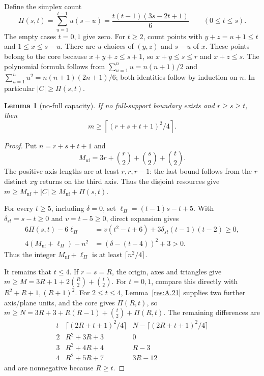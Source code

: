 \documentclass[11pt]{article}
\newtheorem{lemma}[theorem]{Lemma}
\theoremstyle{definition}
\theoremstyle{remark}
\theoremstyle{plain}
\begin{document}
Define the simplex count
\[
\Pi(s,t)=\sum_{u=1}^{t-1}u(s-u)
=\frac{t(t-1)(3s-2t+1)}6\qquad(0\le t\le s).
\]
The empty cases \(t=0,1\) give zero. For \(t\ge2\), count points with \(y+z=u+1\le t\) and \(1\le x\le s-u\). There are \(u\) choices of \((y,z)\) and \(s-u\) of \(x\). These points belong to the core because \(x+y+z\le s+1\), so \(x+y\le s\le r\) and \(x+z\le s\). The polynomial formula follows from \(\sum_{u=1}^{n}u=n(n+1)/2\) and \(\sum_{u=1}^{n}u^2=n(n+1)(2n+1)/6\); both identities follow by induction on \(n\). In particular \(|C|\ge \Pi(s,t)\).

\begin{lemma}[no-full capacity]\label{res:A.22}
If no full-support boundary exists and $r\ge s\ge t$, then
\[
 m\ge\left\lceil(r+s+t+1)^2/4\right\rceil.
\]
\end{lemma}
\begin{proof}
Put $n=r+s+t+1$ and
\[
 M_{\mathrm{nf}}=3r+\binom r2+\binom s2+\binom t2.
\]
The positive axis lengths are at least $r,r,r-1$: the last bound
follows from the $r$ distinct $xy$ returns on the third axis.
Thus the disjoint resources give $m\ge M_{\mathrm{nf}}+|C|\ge M_{\mathrm{nf}}+\Pi(s,t)$.

For every $t\ge5$, including $\delta=0$, set $\ell_{\Pi}=(t-1)s-t+5$.
With $\delta_{st}=s-t\ge0$ and $v=t-5\ge0$, direct expansion gives
\[
\begin{split}
 6\Pi(s,t)-6\ell_{\Pi}
 &=v(t^2-t+6)+3\delta_{st}(t-1)(t-2)\ge0,\\
 4(M_{\mathrm{nf}}+\ell_{\Pi})-n^2&=(\delta-(t-4))^2+3>0.
\end{split}
\]
Thus the integer $M_{\mathrm{nf}}+\ell_{\Pi}$ is at least $\lceil n^2/4\rceil$.

It remains that $t\le4$.  If $r=s=R$, the origin, axes and triangles
give $m\ge M=3R+1+2\binom R2+\binom t2$.
For $t=0,1$, compare this directly with $R^2+R+1,(R+1)^2$.
For $2\le t\le4$, Lemma~\ref{res:A.21} supplies two further axis/plane units,
and the core gives $\Pi(R,t)$, so
$m\ge N=3R+3+R(R-1)+\binom t2+\Pi(R,t)$.
The remaining differences are
\[
\begin{array}{c|c|c}
 t&\lceil(2R+t+1)^2/4\rceil&N-\lceil(2R+t+1)^2/4\rceil\\\hline
 2&R^2+3R+3&0\\
 3&R^2+4R+4&R-3\\
 4&R^2+5R+7&3R-12
\end{array}
\]
and are nonnegative because $R\ge t$.


\end{proof}
\end{document}
